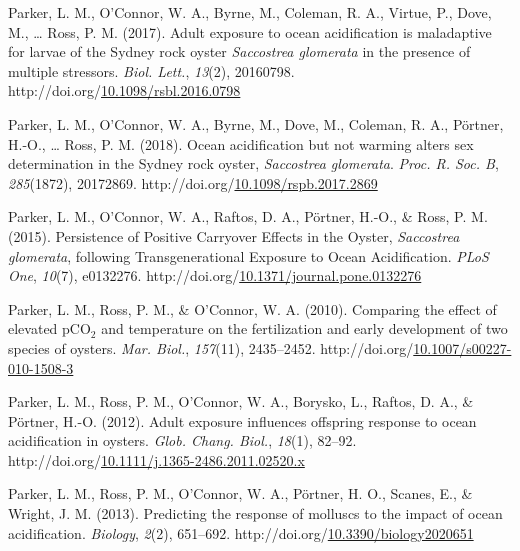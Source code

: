\documentclass [11pt, proquest] {uwthesis}[2015/03/03]
\newlength{\cslhangindent}
\newenvironment{CSLReferences}%
{\setlength{\parindent}{0pt}%
\everypar{\setlength{\hangindent}{\cslhangindent}}\ignorespaces}%
{\par}
\begin{document}
\begin{CSLReferences}{1}{0}
\leavevmode\hypertarget{ref-Parker2017}{}%
Parker, L. M., O'Connor, W. A., Byrne, M., Coleman, R. A., Virtue, P., Dove, M., \ldots{} Ross, P. M. (2017). {Adult exposure to ocean acidification is maladaptive for larvae of the Sydney rock oyster \emph{Saccostrea glomerata} in the presence of multiple stressors}. \emph{Biol. Lett.}, \emph{13}(2), 20160798. http://doi.org/\href{https://doi.org/10.1098/rsbl.2016.0798}{10.1098/rsbl.2016.0798}

\leavevmode\hypertarget{ref-Parker2018}{}%
Parker, L. M., O'Connor, W. A., Byrne, M., Dove, M., Coleman, R. A., Pörtner, H.-O., \ldots{} Ross, P. M. (2018). {Ocean acidification but not warming alters sex determination in the Sydney rock oyster, \emph{Saccostrea glomerata}}. \emph{Proc. R. Soc. B}, \emph{285}(1872), 20172869. http://doi.org/\href{https://doi.org/10.1098/rspb.2017.2869}{10.1098/rspb.2017.2869}

\leavevmode\hypertarget{ref-Parker2015}{}%
Parker, L. M., O'Connor, W. A., Raftos, D. A., Pörtner, H.-O., \& Ross, P. M. (2015). {Persistence of Positive Carryover Effects in the Oyster, \emph{Saccostrea glomerata}, following Transgenerational Exposure to Ocean Acidification}. \emph{PLoS One}, \emph{10}(7), e0132276. http://doi.org/\href{https://doi.org/10.1371/journal.pone.0132276}{10.1371/journal.pone.0132276}

\leavevmode\hypertarget{ref-Parker2010}{}%
Parker, L. M., Ross, P. M., \& O'Connor, W. A. (2010). {Comparing the effect of elevated {pCO\(_2\)} and temperature on the fertilization and early development of two species of oysters}. \emph{Mar. Biol.}, \emph{157}(11), 2435--2452. http://doi.org/\href{https://doi.org/10.1007/s00227-010-1508-3}{10.1007/s00227-010-1508-3}

\leavevmode\hypertarget{ref-Parker2012}{}%
Parker, L. M., Ross, P. M., O'Connor, W. A., Borysko, L., Raftos, D. A., \& Pörtner, H.-O. (2012). {Adult exposure influences offspring response to ocean acidification in oysters}. \emph{Glob. Chang. Biol.}, \emph{18}(1), 82--92. http://doi.org/\href{https://doi.org/10.1111/j.1365-2486.2011.02520.x}{10.1111/j.1365-2486.2011.02520.x}

\leavevmode\hypertarget{ref-Parker2013}{}%
Parker, L. M., Ross, P. M., O'Connor, W. A., Pörtner, H. O., Scanes, E., \& Wright, J. M. (2013). {Predicting the response of molluscs to the impact of ocean acidification}. \emph{Biology}, \emph{2}(2), 651--692. http://doi.org/\href{https://doi.org/10.3390/biology2020651}{10.3390/biology2020651}


\end{CSLReferences}
\end{document}
